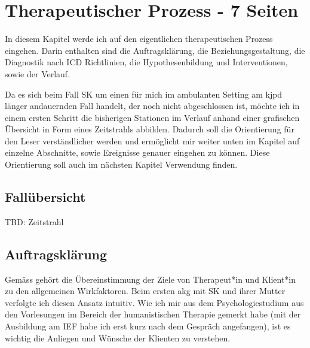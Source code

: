 \section{Therapeutischer Prozess - 7 Seiten}\label{Prozess}
In diesem Kapitel werde ich auf den eigentlichen therapeutischen Prozess eingehen. Darin enthalten sind die Auftragsklärung, die Beziehungsgestaltung, die Diagnostik nach ICD Richtlinien, die Hypothesenbildung und Interventionen, sowie der Verlauf.   

Da es sich beim Fall SK um einen für mich im ambulanten Setting am \ac{kjpd} länger andauernden Fall handelt, der noch nicht abgeschlossen ist, möchte ich in einem ersten Schritt die bisherigen Stationen im Verlauf anhand einer grafischen Übersicht in Form eines Zeitstrahls abbilden. Dadurch soll die Orientierung für den Leser verständlicher werden und ermöglicht mir weiter unten im Kapitel  auf einzelne Abschnitte, sowie Ereignisse genauer eingehen zu können. Diese Orientierung soll auch im nächsten Kapitel  Verwendung finden. 

\subsection{Fallübersicht}\label{lbFallübersicht}
TBD: Zeitstrahl

\subsection{Auftragsklärung}\label{Auftragsklärung} 
Gemäss  gehört die Übereinstimmung der Ziele von Therapeut*in und Klient*in zu den allgemeinen Wirkfaktoren. Beim ersten \acf{akg} mit SK und ihrer Mutter verfolgte ich diesen Ansatz intuitiv. Wie ich mir aus dem Psychologiestudium aus den Vorlesungen im Bereich der humanistischen Therapie gemerkt habe (mit der Ausbildung am IEF habe ich erst kurz nach dem Gespräch angefangen), ist es wichtig die Anliegen und Wünsche der Klienten zu verstehen. 

